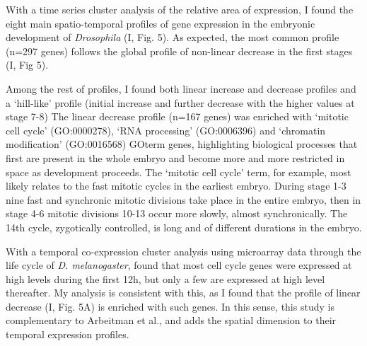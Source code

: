 With a time series cluster analysis \citep{Ernst2006} of the relative area of expression, I found the eight main spatio-temporal profiles of gene expression in the embryonic development of \textit{Drosophila} (I, Fig. 5).
As expected, the most common profile (n=297 genes) follows the global profile of non-linear decrease in the first stages (I, Fig 5).

Among the rest of profiles, I found both linear increase and decrease profiles and a `hill-like' profile (initial increase and further decrease with the higher values at stage 7-8)
%
The linear decrease profile (n=167 genes) was enriched with `mitotic cell cycle' (GO:0000278), `RNA processing' (GO:0006396) and `chromatin modification' (GO:0016568) GOterm genes, highlighting biological processes that first are present in the whole embryo and become more and more restricted in space as development proceeds.
The `mitotic cell cycle' term, for example, most likely relates to the fast mitotic cycles in the earliest embryo. During stage 1-3 nine fast and synchronic mitotic divisions take place in the entire embryo, then in stage 4-6 mitotic divisions 10-13 occur more slowly, almost synchronically. The 14th cycle, zygotically controlled, is long and of different durations in the embryo.

With a temporal co-expression cluster analysis using microarray data through the life cycle of \textit{D. melanogaster}, \citet{Arbeitman2002} found that most cell cycle genes were expressed at high levels during the first 12h, but only a few are expressed at high level thereafter.
My analysis is consistent with this, as I found that the profile of linear decrease (I, Fig. 5A) is enriched with such genes. In this sense, this study is complementary to Arbeitman et al., and adds the spatial dimension to their temporal expression profiles.
